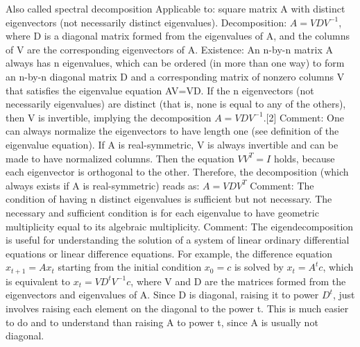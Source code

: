 \begin{slide}
  Also called spectral decomposition
  Applicable to: square matrix A with distinct eigenvectors (not necessarily distinct eigenvalues).
  Decomposition: $A=VDV^{-1}$, where D is a diagonal matrix formed from the eigenvalues of A, and the columns of V are the corresponding eigenvectors of A.
  Existence: An n-by-n matrix A always has n eigenvalues, which can be ordered (in more than one way) to form an n-by-n diagonal matrix D and a corresponding matrix of nonzero columns V that satisfies the eigenvalue equation AV=VD. If the n eigenvectors (not necessarily eigenvalues) are distinct (that is, none is equal to any of the others), then V is invertible, implying the decomposition $A=VDV^{-1}$.[2]
  Comment: One can always normalize the eigenvectors to have length one (see definition of the eigenvalue equation). If A is real-symmetric, V is always invertible and can be made to have normalized columns. Then the equation $VV^T=I$ holds, because each eigenvector is orthogonal to the other. Therefore, the decomposition (which always exists if A is real-symmetric) reads as: $A=VDV^T$
  Comment: The condition of having n distinct eigenvalues is sufficient but not necessary. The necessary and sufficient condition is for each eigenvalue to have geometric multiplicity equal to its algebraic multiplicity.
  Comment: The eigendecomposition is useful for understanding the solution of a system of linear ordinary differential equations or linear difference equations. For example, the difference equation $x_{t+1}=Ax_t$ starting from the initial condition $x_0=c$ is solved by $x_t = A^tc$, which is equivalent to $x_t = VD^tV^{-1}c$, where V and D are the matrices formed from the eigenvectors and eigenvalues of A. Since D is diagonal, raising it to power $D^t$, just involves raising each element on the diagonal to the power t. This is much easier to do and to understand than raising A to power t, since A is usually not diagonal.

\end{slide}
